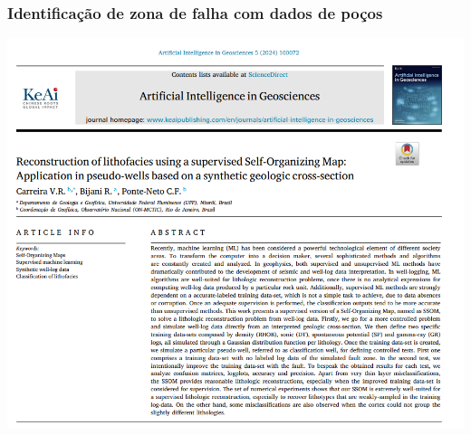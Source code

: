 \documentclass[aspectratio=169]{beamer} %
\begin{document}
\begin{frame}
	\frametitle{Identificação de zona de falha com dados de poços}
	\centering
	\includegraphics[scale=0.25]{images/carreira2024.png} 
\end{frame}
\end{document}
